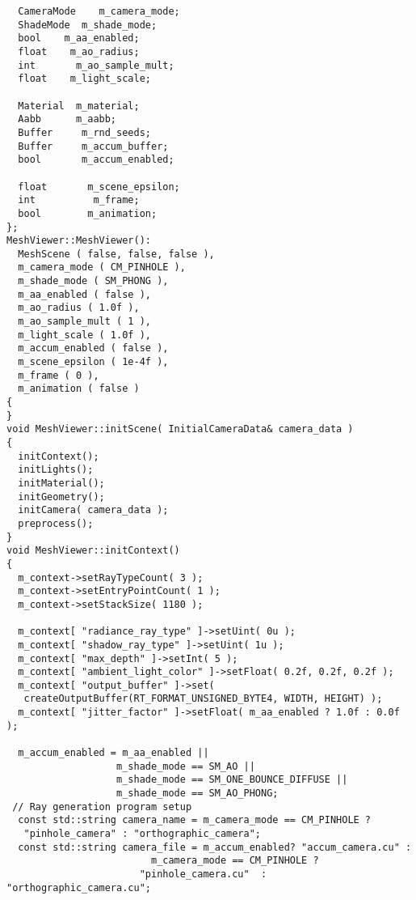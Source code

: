\begin{verbatim}
  CameraMode    m_camera_mode;
  ShadeMode  m_shade_mode;
  bool    m_aa_enabled;
  float    m_ao_radius;
  int       m_ao_sample_mult;
  float    m_light_scale;

  Material  m_material;
  Aabb      m_aabb;
  Buffer     m_rnd_seeds;
  Buffer     m_accum_buffer;
  bool       m_accum_enabled;

  float       m_scene_epsilon;
  int          m_frame;
  bool        m_animation;
};
MeshViewer::MeshViewer():
  MeshScene ( false, false, false ),
  m_camera_mode ( CM_PINHOLE ),
  m_shade_mode ( SM_PHONG ),
  m_aa_enabled ( false ),
  m_ao_radius ( 1.0f ),
  m_ao_sample_mult ( 1 ),
  m_light_scale ( 1.0f ),
  m_accum_enabled ( false ),
  m_scene_epsilon ( 1e-4f ),
  m_frame ( 0 ),
  m_animation ( false )
{
}
void MeshViewer::initScene( InitialCameraData& camera_data )
{
  initContext();
  initLights();
  initMaterial();
  initGeometry();
  initCamera( camera_data );
  preprocess();
}
void MeshViewer::initContext()
{
  m_context->setRayTypeCount( 3 );
  m_context->setEntryPointCount( 1 );
  m_context->setStackSize( 1180 );

  m_context[ "radiance_ray_type" ]->setUint( 0u );
  m_context[ "shadow_ray_type" ]->setUint( 1u );
  m_context[ "max_depth" ]->setInt( 5 );
  m_context[ "ambient_light_color" ]->setFloat( 0.2f, 0.2f, 0.2f );
  m_context[ "output_buffer" ]->set(
   createOutputBuffer(RT_FORMAT_UNSIGNED_BYTE4, WIDTH, HEIGHT) );
  m_context[ "jitter_factor" ]->setFloat( m_aa_enabled ? 1.0f : 0.0f );
  
  m_accum_enabled = m_aa_enabled ||
                   m_shade_mode == SM_AO ||
                   m_shade_mode == SM_ONE_BOUNCE_DIFFUSE ||
                   m_shade_mode == SM_AO_PHONG;
 // Ray generation program setup
  const std::string camera_name = m_camera_mode == CM_PINHOLE ?
   "pinhole_camera" : "orthographic_camera"; 
  const std::string camera_file = m_accum_enabled? "accum_camera.cu" :
                         m_camera_mode == CM_PINHOLE ?
                       "pinhole_camera.cu"  : "orthographic_camera.cu";


\end{verbatim}
